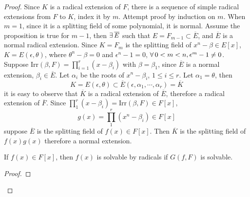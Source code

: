 \begin{proof}
    Since $K$ is a radical extension of $F$, there is a sequence of simple radical extensions from $F$ to $K$, index it by $m$. Attempt proof by induction on $m$. When $m=1$, since it is a splitting field of some polynomial, it is normal. Assume the proposition is true for $m-1$, then $\exists\,\overline{E}$ such that $E=F_{m-1}\subset\overline{E}$, and $\overline{E}$ is a normal radical extension. Since $K=F_m$ is the splitting field of $x^n-\beta\in E[x]$, $K=E(\epsilon,\theta)$, where $\theta^n-\beta=0$ and $\epsilon^n-1=0$, $\forall\, 0<m<n, \epsilon^m-1\neq 0$. Suppose $\mathrm{Irr}(\beta,F)=\prod^r_{i=1}(x-\beta_i)$ with $\beta=\beta_1$, since $\overline{E}$ is a normal extension, $\beta_i\in\overline{E}$. Let $\alpha_i$ be the roots of $x^n-\beta_i$, $1\le i\le r$. Let $\alpha_1=\theta$, then
    $$
    K=E(\epsilon,\theta)\subset\overline{E}(\epsilon,\alpha_1,\cdots,\alpha_r)=\overline{K}
    $$
    it is easy to observe that $\overline{K}$ is a radical extension of $\overline{E}$, therefore a radical extension of $\overline{F}$. Since $\prod^r_1(x-\beta_i)=\mathrm{Irr}(\beta,F)\in F[x]$,
    $$
    g(x)=\prod^r_1(x^n-\beta_i)\in F[x]
    $$
    suppose $\overline{E}$ is the splitting field of $f(x)\in F[x]$. Then $\overline{K}$ is the splitting field of $f(x)g(x)$ therefore a normal extension.
    \begin{theorem}
        If $f(x)\in F[x]$, then $f(x)$ is solvable by radicals if $G(f,F)$ is solvable.
    \end{theorem}
    \begin{proof}
        
    \end{proof}
\end{proof}